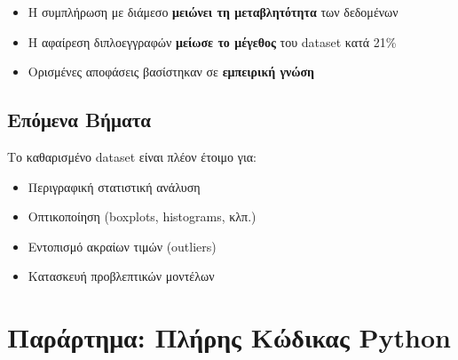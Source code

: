 \documentclass[12pt,a4paper]{article}
\begin{document}
\begin{itemize}
    \item \textgreek{Η συμπλήρωση με διάμεσο} \textbf{\textgreek{μειώνει τη μεταβλητότητα}} \textgreek{των δεδομένων}
    \item \textgreek{Η αφαίρεση διπλοεγγραφών} \textbf{\textgreek{μείωσε το μέγεθος}} \textgreek{του dataset κατά 21\%}
    \item \textgreek{Ορισμένες αποφάσεις βασίστηκαν σε} \textbf{\textgreek{εμπειρική γνώση}}
\end{itemize}

\subsection{\textgreek{Επόμενα Βήματα}}

\textgreek{Το καθαρισμένο dataset είναι πλέον έτοιμο για:}
\begin{itemize}
    \item \textgreek{Περιγραφική στατιστική ανάλυση}
    \item \textgreek{Οπτικοποίηση (boxplots, histograms, κλπ.)}
    \item \textgreek{Εντοπισμό ακραίων τιμών (outliers)}
    \item \textgreek{Κατασκευή προβλεπτικών μοντέλων}
\end{itemize}

\appendix
\section{\textgreek{Παράρτημα: Πλήρης Κώδικας Python}}
\end{document}

